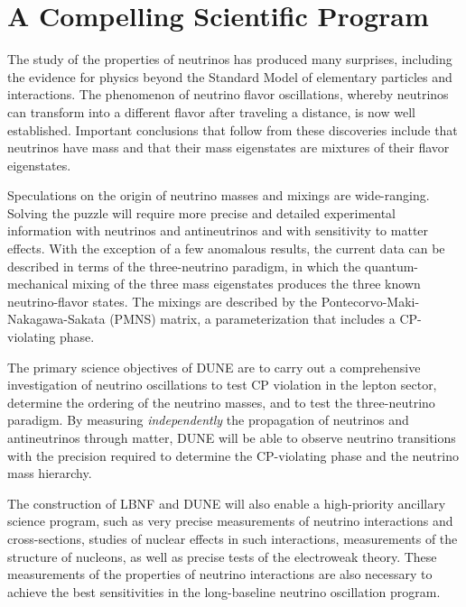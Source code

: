 \section{A Compelling Scientific Program}

The study of the properties of neutrinos has produced %
many surprises, including the evidence for physics beyond the Standard Model of elementary particles and interactions.   The phenomenon of neutrino flavor oscillations, whereby 
neutrinos can transform into a different flavor after traveling a distance, %
is now well established. Important conclusions that follow from these discoveries include that neutrinos have mass and that their %
mass eigenstates are mixtures of their %
flavor eigenstates.

Speculations on the origin of neutrino masses and mixings are wide-ranging. 
Solving the puzzle will require more precise and detailed experimental information with neutrinos and antineutrinos and with sensitivity to matter effects. With the exception of a few anomalous results, the current data can be described in terms of the three-neutrino paradigm, in which the 
quantum-mechanical mixing of the three mass eigenstates produces the three known neutrino-flavor states.  The mixings are described by the Pontecorvo-Maki-Nakagawa-Sakata (PMNS) matrix, a parameterization that includes a CP-violating phase. 

The primary science objectives %
of DUNE are to carry out a comprehensive investigation of neutrino oscillations to test CP violation in the lepton sector, determine the ordering of the neutrino masses, and to test the three-neutrino paradigm.
By measuring \textit{independently} the  propagation of neutrinos and antineutrinos through matter, DUNE will be able to observe %
neutrino transitions with the precision required to determine the 
CP-violating phase and %
the neutrino mass hierarchy.

The construction of LBNF and DUNE will also enable a high-priority ancillary science program, such as 
very precise measurements of neutrino interactions and cross-sections, studies of nuclear effects in such interactions, measurements of the structure of nucleons, as well as precise tests of the electroweak theory. 
These measurements of the properties of neutrino interactions are also necessary 
to achieve the best sensitivities in the long-baseline neutrino oscillation program. %


